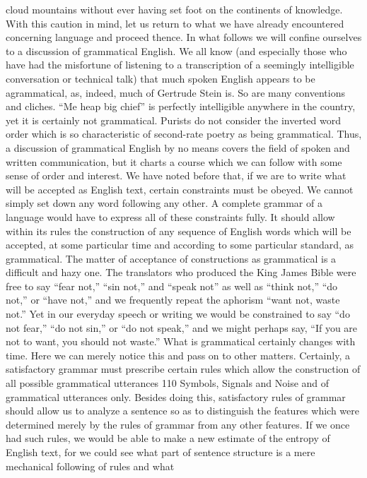 {{{cloud mountains without ever having set foot on the continents of
knowledge.
With this caution in mind, let us return to what we have already
encountered concerning language and proceed thence.
In what follows we will confine ourselves to a discussion of
grammatical English. We all know (and especially those who have
had the misfortune of listening to a transcription of a seemingly
intelligible conversation or technical talk) that much spoken English
appears to be agrammatical, as, indeed, much of Gertrude
Stein is. So are many conventions and cliches. “Me heap big
chief” is perfectly intelligible anywhere in the country, yet it is
certainly not grammatical. Purists do not consider the inverted
word order which is so characteristic of second-rate poetry as being
grammatical.
Thus, a discussion of grammatical English by no means covers
the field of spoken and written communication, but it charts a
course which we can follow with some sense of order and interest.
We have noted before that, if we are to write what will be
accepted as English text, certain constraints must be obeyed. We
cannot simply set down any word following any other. A complete
grammar of a language would have to express all of these constraints
fully. It should allow within its rules the construction of
any sequence of English words which will be accepted, at some
particular time and according to some particular standard, as
grammatical.
The matter of acceptance of constructions as grammatical is a
difficult and hazy one. The translators who produced the King
James Bible were free to say “fear not,” “sin not,” and “speak not”
as well as “think not,” “do not,” or “have not,” and we frequently
repeat the aphorism “want not, waste not.” Yet in our everyday
speech or writing we would be constrained to say “do not fear,”
“do not sin,” or “do not speak,” and we might perhaps say, “If
you are not to want, you should not waste.” What is grammatical
certainly changes with time. Here we can merely notice this and
pass on to other matters.
Certainly, a satisfactory grammar must prescribe certain rules
which allow the construction of all possible grammatical utterances
110
Symbols, Signals and Noise
and of grammatical utterances only. Besides doing this, satisfactory
rules of grammar should allow us to analyze a sentence so as to
distinguish the features which were determined merely by the rules
of grammar from any other features.
If we once had such rules, we would be able to make a new estimate
of the entropy of English text, for we could see what part of
sentence structure is a mere mechanical following of rules and what
}}}
